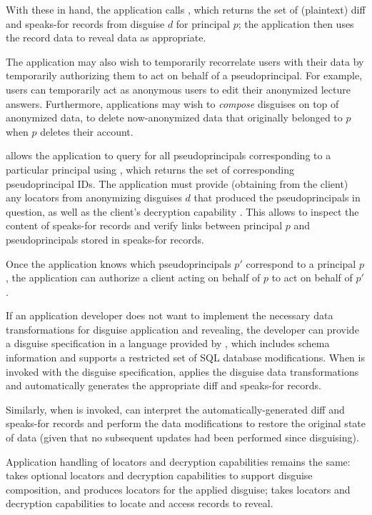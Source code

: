 With these in hand, the application calls , which returns the set of
(plaintext) diff and speaks-for records from disguise $d$ for principal $p$; the application then uses
the record data to reveal data as appropriate.

The application may also wish to temporarily recorrelate users with their data by temporarily
authorizing them to act on behalf of a pseudoprincipal. For example, users can temporarily act as
anonymous users to edit their anonymized lecture answers. Furthermore, applications may wish to
\emph{compose} disguises on top of anonymized data, to \eg delete now-anonymized data that
originally belonged to $p$ when $p$ deletes their account.

\sys allows the application to query for all pseudoprincipals corresponding to a particular
principal using , which returns the set of corresponding pseudoprincipal
IDs. The application must provide (obtaining from the client) any locators  from
anonymizing disguises $d$ that produced the pseudoprincipals in question, as well as the client's
decryption capability . This allows \sys to inspect the content of speaks-for records and
verify links between principal $p$ and pseudoprincipals stored in speaks-for records.

Once the application knows which pseudoprincipals $p'$ correspond to a principal $p$, the application can
authorize a client acting on behalf of $p$ to act on behalf of $p'$.

If an application developer does not want to implement the necessary data transformations for disguise
application and revealing, the developer can provide a disguise specification in a language provided
by \sys, which includes schema information and supports a restricted set of SQL database
modifications. When  is invoked with the disguise specification, \sys applies the
disguise data transformations and automatically generates the appropriate diff and speaks-for records.

Similarly, when  is invoked, \sys can interpret the automatically-generated diff and
speaks-for records and perform the data modifications to restore the original state of data (given
that no subsequent updates had been performed since disguising).

Application handling of locators and decryption capabilities remains the same: 
takes optional locators and decryption capabilities to support disguise composition, and produces
locators for the applied disguise;  takes locators and decryption capabilities to
locate and access records to reveal.

